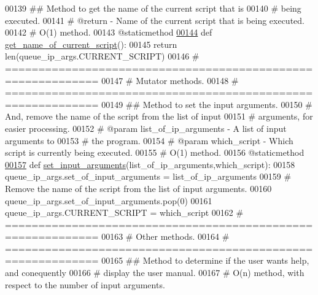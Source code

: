 \begin{DoxyCode}
00139     \textcolor{comment}{##  Method to get the name of the current script that is}
00140     \textcolor{comment}{#       being executed.}
00141     \textcolor{comment}{#   @return - Name of the current script that is being executed.}
00142     \textcolor{comment}{#   O(1) method.}
00143     @staticmethod
\hypertarget{queue__ip__arguments_8py_source_l00144}{}\hyperlink{classutilities_1_1queue__ip__arguments_1_1queue__ip__args_a9eb36bdd493a2c866460b4d9fb24b68c}{00144}     \textcolor{keyword}{def }\hyperlink{classutilities_1_1queue__ip__arguments_1_1queue__ip__args_a9eb36bdd493a2c866460b4d9fb24b68c}{get\_name\_of\_current\_script}():
00145         \textcolor{keywordflow}{return} len(queue\_ip\_args.CURRENT\_SCRIPT)
00146     \textcolor{comment}{# ============================================================}
00147     \textcolor{comment}{#   Mutator methods.}
00148     \textcolor{comment}{# ============================================================}
00149     \textcolor{comment}{##  Method to set the input arguments.}
00150     \textcolor{comment}{#       And, remove the name of the script from the list of input}
00151     \textcolor{comment}{#       arguments, for easier processing.}
00152     \textcolor{comment}{#   @param list\_of\_ip\_arguments - A list of input arguments to}
00153     \textcolor{comment}{#       the program.}
00154     \textcolor{comment}{#   @param which\_script - Which script is currently being executed.}
00155     \textcolor{comment}{#   O(1) method.}
00156     @staticmethod
\hypertarget{queue__ip__arguments_8py_source_l00157}{}\hyperlink{classutilities_1_1queue__ip__arguments_1_1queue__ip__args_a4c536970af155ee6cc2c2886b145f807}{00157}     \textcolor{keyword}{def }\hyperlink{classutilities_1_1queue__ip__arguments_1_1queue__ip__args_a4c536970af155ee6cc2c2886b145f807}{set\_input\_arguments}(list\_of\_ip\_arguments,which\_script):
00158         queue\_ip\_args.set\_of\_input\_arguments = list\_of\_ip\_arguments
00159         \textcolor{comment}{# Remove the name of the script from the list of input arguments.}
00160         queue\_ip\_args.set\_of\_input\_arguments.pop(0)
00161         queue\_ip\_args.CURRENT\_SCRIPT = which\_script
00162     \textcolor{comment}{# ============================================================}
00163     \textcolor{comment}{#   Other methods.}
00164     \textcolor{comment}{# ============================================================}
00165     \textcolor{comment}{##  Method to determine if the user wants help, and conequently}
00166     \textcolor{comment}{#       display the user manual.}
00167     \textcolor{comment}{#   O(n) method, with respect to the number of input arguments.}

\end{DoxyCode}
